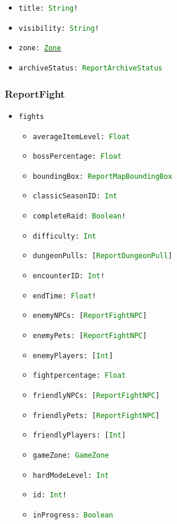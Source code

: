 \documentclass[10pt, a4paper]{memoir}
\numberwithin{equation}{section}
\theoremstyle{plain}
\theoremstyle{defp}
\theoremstyle{dotless}
\theoremstyle{definition}
\theoremstyle{dotless}
\theoremstyle{dotless}
\theoremstyle{defp}
\theoremstyle{defp}
\theoremstyle{be}          %
\theoremstyle{defp}
\newcommand\ttt[1]{\texttt{#1}}
\newcommand\type[1]{\ttt{\textcolor{green}{#1}}}
\begin{document}
\begin{itemize}[noitemsep,topsep=1pt]
\begin{itemize}[itemsep=1pt,topsep=1pt]
		\item \ttt{title: \type{String}!}
		\item \ttt{visibility: \type{String}!}
		\item \ttt{zone: \hyperref[sec:Zone]{\type{Zone}}}
		\item \ttt{archiveStatus: \type{ReportArchiveStatus}}
\end{itemize}
\end{itemize}


\subsubsection{ReportFight}\label{sec:ReportFight}

\begin{itemize}[noitemsep, topsep=1pt]
\item \ttt{fights}
\begin{itemize}[itemsep=1pt, topsep=1pt]
\item \ttt{averageItemLevel: \type{Float}}
\item \ttt{bossPercentage: \type{Float}}
\item \ttt{boundingBox: \type{ReportMapBoundingBox}}
\item \ttt{classicSeasonID: \type{Int}}
\item \ttt{completeRaid: \type{Boolean}!}
\item \ttt{difficulty: \type{Int}}
\item \ttt{dungeonPulls: [\type{ReportDungeonPull}]}
\item \ttt{encounterID: \type{Int}!}
\item \ttt{endTime: \type{Float}!}
\item \ttt{enemyNPCs: [\type{ReportFightNPC}]}
\item \ttt{enemyPets: [\type{ReportFightNPC}]}
\item \ttt{enemyPlayers: [\type{Int}]}
\item \ttt{fightpercentage: \type{Float}}
\item \ttt{friendlyNPCs: [\type{ReportFightNPC}]}
\item \ttt{friendlyPets: [\type{ReportFightNPC}]}
\item \ttt{friendlyPlayers: [\type{Int}]}
\item \ttt{gameZone: \type{GameZone}}
\item \ttt{hardModeLevel: \type{Int}}
\item \ttt{id: \type{Int}!}
\item \ttt{inProgress: \type{Boolean}}

\end{itemize}
\end{itemize}
\end{document}
